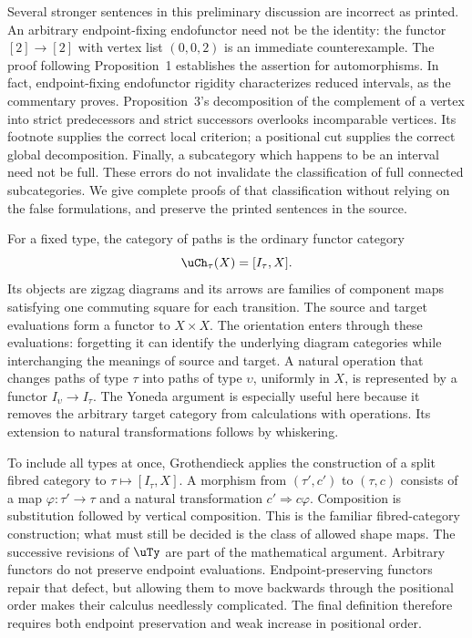 Several stronger sentences in this preliminary discussion are incorrect as printed. An arbitrary endpoint-fixing endofunctor need not be the identity: the functor $[2]\to[2]$ with vertex list $(0,0,2)$ is an immediate counterexample. The proof following Proposition~1 establishes the assertion for automorphisms. In fact, endpoint-fixing endofunctor rigidity characterizes reduced intervals, as the commentary proves. Proposition~3's decomposition of the complement of a vertex into strict predecessors and strict successors overlooks incomparable vertices. Its footnote supplies the correct local criterion; a positional cut supplies the correct global decomposition. Finally, a subcategory which happens to be an interval need not be full. These errors do not invalidate the classification of full connected subcategories. We give complete proofs of that classification without relying on the false formulations, and preserve the printed sentences in the source.

For a fixed type, the category of paths is the ordinary functor category
\[
 \uCh_\tau(X)=[I_\tau,X].
\]
Its objects are zigzag diagrams and its arrows are families of component maps satisfying one commuting square for each transition. The source and target evaluations form a functor to $X\times X$. The orientation enters through these evaluations: forgetting it can identify the underlying diagram categories while interchanging the meanings of source and target. A natural operation that changes paths of type $\tau$ into paths of type $\upsilon$, uniformly in $X$, is represented by a functor $I_\upsilon\to I_\tau$. The Yoneda argument is especially useful here because it removes the arbitrary target category from calculations with operations. Its extension to natural transformations follows by whiskering.

To include all types at once, Grothendieck applies the construction of a split fibred category to $\tau\mapsto[I_\tau,X]$. A morphism from $(\tau',c')$ to $(\tau,c)$ consists of a map $\varphi:\tau'\to\tau$ and a natural transformation $c'\Rightarrow c\varphi$. Composition is substitution followed by vertical composition. This is the familiar fibred-category construction; what must still be decided is the class of allowed shape maps. The successive revisions of $\uTy$ are part of the mathematical argument. Arbitrary functors do not preserve endpoint evaluations. Endpoint-preserving functors repair that defect, but allowing them to move backwards through the positional order makes their calculus needlessly complicated. The final definition therefore requires both endpoint preservation and weak increase in positional order.

